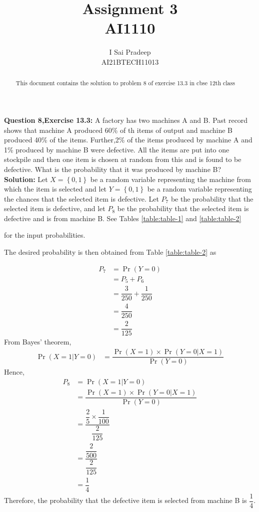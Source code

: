 \documentclass[journal,12pt,twocolumn]{IEEEtran}
\providecommand{\pr}[1]{\ensuremath{\Pr\left(#1\right)}}
\providecommand{\cbrak}[1]{\ensuremath{\left\{#1\right\}}}
\begin{document}
	\title{\huge{Assignment 3}\\AI1110}
	\author{\Large{I Sai Pradeep}\\AI21BTECH11013}
	\maketitle
	\begin{abstract}
		This document contains the solution to problem 8 of exercise 13.3 in cbse  12th class 
	\end{abstract}
	\noindent \textbf{Question 8,Exercise 13.3:}
	A factory has two machines A and B. Past record shows that machine A produced 60\% of th items of output and machine B produced 40\% of the items. Further,2\% of the items produced by machine A and 1\% produced by machine B were defective. All the items are put into one stockpile and then one item is chosen at random from this and is found to be defective. What is the probability that it was produced by machine B? \\
	\textbf{Solution:} Let $X=\cbrak{0,1}$ be a random variable representing the machine from which the item is selected and let $Y=\cbrak{0,1}$ be a random variable representing the chances that the selected item is defective. Let $P_7$ be the probability that the selected item is defective, and let $P_8$ be the probability that the selected item is defective and is from machine B.
	See Tables 
	\eqref{table:table-1}
	and 
	\eqref{table:table-2} 
	\begin{table}[ht!]
		
		\vspace*{5pt}
		\caption{}
		\label{table:table-1}
	\end{table}
	\begin{table}[ht!]
		
		\vspace*{5pt}
		\caption{}
		\label{table:table-2}
	\end{table}
	for the input probabilities.
	
	The desired probability is then obtained from Table \eqref{table:table-2} as
	
	\begin{align}
		P_7 &=\pr{Y=0}\\
		&=P_5+P_6 \\		
		&= \dfrac{3}{250}+ \dfrac{1}{250}\\
		&= \dfrac{4}{250}\\
		&= \dfrac{2}{125}
	\end{align}
	From Bayes' theorem, 
	\begin{align}
		\pr{X=1|Y=0}
		&=\dfrac{\pr{X=1}\times\pr{Y=0|X=1}}{\pr{Y=0}}
	\end{align}
	Hence,
	\begin{align}
		P_8 &=\pr{X=1|Y=0} \\
		&=\dfrac{\pr{X=1}\times\pr{Y=0|X=1}}{\pr{Y=0}}\\
		&= \dfrac{\dfrac{2}{5}\times\dfrac{1}{100}}{\dfrac{2}{125}}\\
		&= \dfrac{\dfrac{2}{500}}{\dfrac{2}{125}}\\
		&=\dfrac{1}{4}
	\end{align}
	Therefore, the probability that the defective item is selected from machine B is $\dfrac{1}{4}$.
\end{document}
